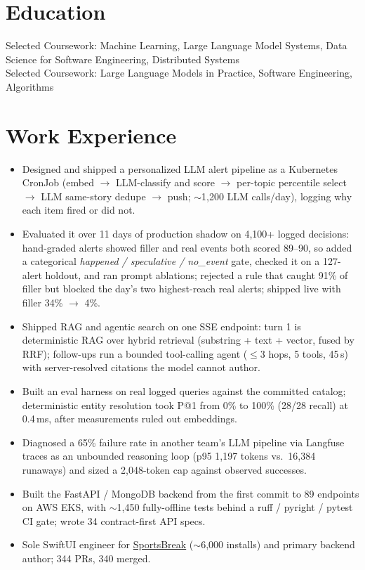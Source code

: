 \documentclass[11pt, letterpaper]{article}
\begin{document}

\section{Education}
Selected Coursework: Machine Learning, Large Language Model Systems, Data Science for Software Engineering, Distributed Systems\\[1pt]
Selected Coursework: Large Language Models in Practice, Software Engineering, Algorithms

\section{Work Experience}
\begin{itemize}
  \item Designed and shipped a personalized LLM alert pipeline as a Kubernetes CronJob (embed $\to$ LLM-classify and score $\to$ per-topic percentile select $\to$ LLM same-story dedupe $\to$ push; $\sim$1{,}200 LLM calls/day), logging why each item fired or did not.
  \item Evaluated it over 11 days of production shadow on 4{,}100+ logged decisions: hand-graded alerts showed filler and real events both scored 89--90, so added a categorical \textit{happened / speculative / no\_event} gate, checked it on a 127-alert holdout, and ran prompt ablations; rejected a rule that caught 91\% of filler but blocked the day's two highest-reach real alerts; shipped live with filler 34\% $\to$ 4\%.
  \item Shipped RAG and agentic search on one SSE endpoint: turn 1 is deterministic RAG over hybrid retrieval (substring + text + vector, fused by RRF); follow-ups run a bounded tool-calling agent ($\le$3 hops, 5 tools, 45\,s) with server-resolved citations the model cannot author.
  \item Built an eval harness on real logged queries against the committed catalog; deterministic entity resolution took P@1 from 0\% to 100\% (28/28 recall) at 0.4\,ms, after measurements ruled out embeddings.
  \item Diagnosed a 65\% failure rate in another team's LLM pipeline via Langfuse traces as an unbounded reasoning loop (p95 1{,}197 tokens vs.\ 16{,}384 runaways) and sized a 2{,}048-token cap against observed successes.
  \item Built the FastAPI / MongoDB backend from the first commit to 89 endpoints on AWS EKS, with $\sim$1{,}450 fully-offline tests behind a ruff / pyright / pytest CI gate; wrote 34 contract-first API specs.
  \item Sole SwiftUI engineer for \href{https://apps.apple.com/app/id6762649287}{SportsBreak} ($\sim$6{,}000 installs) and primary backend author; 344 PRs, 340 merged.
\end{itemize}
\end{document}
